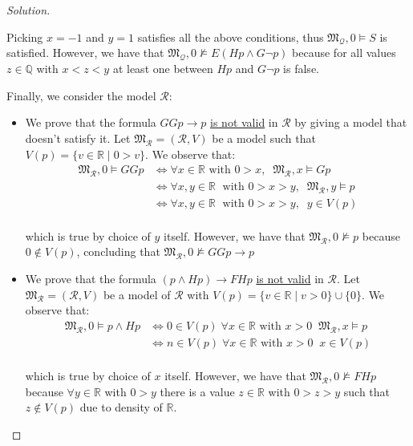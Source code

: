 \documentclass[12pt,a4paper]{report}
\theoremstyle{definition}
\newcommand{\Q}{\mathbb{Q}}                     %
\newcommand{\R}{\mathbb{R}}                     %
\newcommand{\model}[1]{\mathfrak{#1}}           %
\begin{document}
\begin{proof}[Solution]
\begin{itemize}
            Picking $x = -1$ and $y = 1$ satisfies all the above conditions, thus $\model{M}_{\mathcal{Q}}, 0 \models S$ is satisfied. However, we have that $\model{M}_{\mathcal{Q}}, 0 \not\models E(Hp \land G \lnot p)$ because for all values $z \in \Q$ with $x < z < y$ at least one between $Hp$ and $G \lnot p$ is false.
        \end{itemize}


        Finally, we consider the model $\mathcal{R}$:
        \begin{itemize}
            \item We prove that the formula $GGp \to p$ \underline{is not valid} in $\mathcal{R}$ by giving a model that doesn't satisfy it. Let $\model{M}_{\mathcal{R}} = (\mathcal{R}, V)$ be a model such that $V(p) = \{v \in \R \mid 0 > v\}$. We observe that:
            \[\begin{split}
                \model{M}_{\mathcal{R}}, 0 \models GGp & \iff \forall x \in \R \text{ with } 0 > x, \;\; \model{M}_{\mathcal{R}}, x \models Gp \\
                & \iff \forall x,y  \in \R \; \text{ with } 0 > x > y, \;\; \model{M}_{\mathcal{R}}, y \models p \\ 
                & \iff \forall x,y \in \R \; \text{ with } 0 > x > y, \;\; y \in V(p) \\ 
            \end{split}\]

            which is true by choice of $y$ itself. However, we have that $\model{M}_{\mathcal{R}}, 0 \not\models p$ because $0 \notin V(p)$, concluding that $\model{M}_{\mathcal{R}}, 0 \not\models GGp \to p$

            \item We prove that the formula $(p \land Hp) \to FHp$ \underline{is not valid} in $\mathcal{R}$. Let $\model{M}_{\mathcal{R}} = (\mathcal{R}, V)$ be a model of $\mathcal{R}$ with $V(p) = \{v \in \R \mid v > 0\} \cup \{0\}$. We observe that:
            \[\begin{split}
                \model{M}_{\mathcal{R}}, 0 \models p \land Hp & \iff 0 \in V(p) \; \forall x \in \R \text{ with } x > 0 \;\; \model{M}_{\mathcal{R}}, x \models p \\
                & \iff n \in V(p) \; \forall x \in \R \text{ with } x > 0 \;\; x \in V(p) \\
            \end{split}\]
            
            which is true by choice of $x$ itself. However, we have that $\model{M}_{\mathcal{R}}, 0 \not\models FHp$ because $\forall y \in \R$ with $0 > y$ there is a value $z \in \R$ with $0 > z > y$ such that $z \notin V(p)$  due to density of $\R$.


\end{itemize}
\end{proof}
\end{document}
